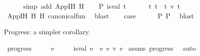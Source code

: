 \begin{isabellebody}
\ \ \ \ \isamarkupfalse%
\ {\isacharparenleft}{\kern0pt}simp\ add{\isacharcolon}{\kern0pt}\ App{\isachardot}{\kern0pt}IH{\isacharparenleft}{\kern0pt}{}{\isacharparenright}{\kern0pt}\ H{}{\isacharparenright}{\kern0pt}\isanewline
\ \ \isamarkupfalse%
\ P{}{\isacharcolon}{\kern0pt}\ {\isachardoublequoteopen}is{\isacharunderscore}{\kern0pt}val\ t{}\ {\isasymLongrightarrow}\isanewline
\ \ \ \ \ {\isacharparenleft}{\kern0pt}{\isasymexists}t{\isacharprime}{\kern0pt}{\isachardot}{\kern0pt}\ {\isacharparenleft}{\kern0pt}t{}\ {\isasymcdot}\ t{}{\isacharparenright}{\kern0pt}\ {\isasymrightarrow}\isactrlsub v\ t{\isacharprime}{\kern0pt}{\isacharparenright}{\kern0pt}{\isachardoublequoteclose}\isanewline
\ \ \ \ \isamarkupfalse%
\ App{\isachardot}{\kern0pt}IH{\isacharparenleft}{\kern0pt}{}{\isacharparenright}{\kern0pt}\ H{}\ H{}\ canonical{\isacharunderscore}{\kern0pt}fun\ \isamarkupfalse%
\ blast\isanewline
\ \ \isamarkupfalse%
\ {\isacharquery}{\kern0pt}case\isanewline
\ \ \ \ \isamarkupfalse%
\ P{}\ P{}\ \isamarkupfalse%
\ blast\isanewline
{}\isamarkupfalse%
%
\endisatagproof
{\isafoldproof}%
%
\isadelimproof
%
\endisadelimproof
%
\begin{isamarkuptext}%
Progress: a simpler corollary.%
\end{isamarkuptext}\isamarkuptrue%
\isamarkupfalse%
\ progress{\isacharprime}{\kern0pt}{\isacharcolon}{\kern0pt}\isanewline
\ \ \ {\isachardoublequoteopen}{\isacharbrackleft}{\kern0pt}{\isacharbrackright}{\kern0pt}\ {\isasymturnstile}\ e\ {\isacharcolon}{\kern0pt}\ {\isasymtau}{\isachardoublequoteclose}\isanewline
\ \ \ {\isachardoublequoteopen}is{\isacharunderscore}{\kern0pt}val\ e\ {\isasymor}\ {\isacharparenleft}{\kern0pt}{\isasymexists}e{\isacharprime}{\kern0pt}{\isachardot}{\kern0pt}\ e\ {\isasymrightarrow}\isactrlsub v\ e{\isacharprime}{\kern0pt}{\isacharparenright}{\kern0pt}{\isachardoublequoteclose}\isanewline
%
\isadelimproof
%
\endisadelimproof
%
\isatagproof
{}\isamarkupfalse%
\ assms\ progress\ \isamarkupfalse%
\ auto%
\endisatagproof
{\isafoldproof}%
%
\isadelimproof
%
\endisadelimproof
%
\isadelimdocument
%
\endisadelimdocument
%
\isatagdocument
%
\isamarkuptrue%
%
\endisatagdocument

\end{isabellebody}
